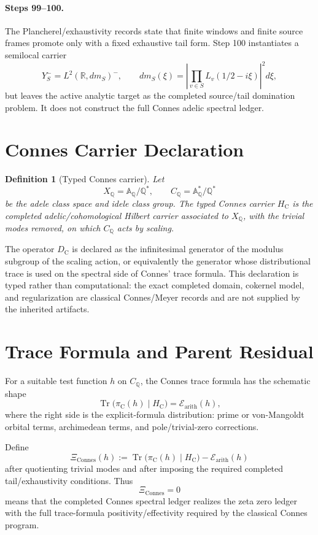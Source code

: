 \documentclass[11pt]{article}
\newtheorem{definition}{Definition}
\newcommand{\A}{\mathbb A}
\newcommand{\Q}{\mathbb Q}
\newcommand{\HC}{H_{\mathrm C}}
\newcommand{\DC}{D_{\mathrm C}}
\newcommand{\XiConnes}{\Xi_{\mathrm{Connes}}}
\begin{document}
\paragraph{Steps 99--100.}
The Plancherel/exhaustivity records state that finite windows and finite
source frames promote only with a fixed exhaustive tail form.  Step 100
instantiates a semilocal carrier
\[
Y_S^- = L^2(\mathbb R,dm_S)^-,
\qquad
dm_S(\xi)=\left|\prod_{v\in S}L_v(1/2-i\xi)\right|^2d\xi,
\]
but leaves the active analytic target as the completed source/tail domination
problem.  It does not construct the full Connes adelic spectral ledger.

\section*{Connes Carrier Declaration}

\begin{definition}[Typed Connes carrier]
Let
\[
X_\Q=\A_\Q/\Q^*,\qquad C_\Q=\A_\Q^*/\Q^*
\]
be the adele class space and idele class group.  The typed Connes carrier
\(\HC\) is the completed adelic/cohomological Hilbert carrier associated to
\(X_\Q\), with the trivial modes removed, on which \(C_\Q\) acts by scaling.
\end{definition}

The operator \(\DC\) is declared as the infinitesimal generator of the modulus
subgroup of the scaling action, or equivalently the generator whose
distributional trace is used on the spectral side of Connes' trace formula.
This declaration is typed rather than computational: the exact completed
domain, cokernel model, and regularization are classical Connes/Meyer records
and are not supplied by the inherited artifacts.

\section*{Trace Formula and Parent Residual}

For a suitable test function \(h\) on \(C_\Q\), the Connes trace formula has
the schematic shape
\[
\operatorname{Tr}\bigl(\pi_{\mathrm C}(h)\mid \HC\bigr)
=
\mathcal E_{\mathrm{arith}}(h),
\]
where the right side is the explicit-formula distribution: prime or
von-Mangoldt orbital terms, archimedean terms, and pole/trivial-zero
corrections.

Define
\[
\XiConnes(h)
:=
\operatorname{Tr}\bigl(\pi_{\mathrm C}(h)\mid \HC\bigr)
-
\mathcal E_{\mathrm{arith}}(h)
\]
after quotienting trivial modes and after imposing the required completed
tail/exhaustivity conditions.  Thus
\[
\XiConnes=0
\]
means that the completed Connes spectral ledger realizes the zeta zero ledger
with the full trace-formula positivity/effectivity required by the classical
Connes program.
\end{document}
